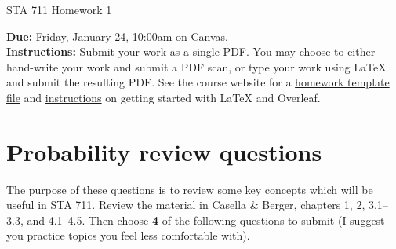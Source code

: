 \documentclass[11pt]{article}
\begin{document}
\begin{center}
\Large
STA 711 Homework 1\\
\normalsize
\vspace{5mm}
\end{center}

\noindent \textbf{Due:} Friday, January 24, 10:00am on Canvas.\\ 

\noindent \textbf{Instructions:} Submit your work as a single PDF. You may choose to either hand-write your work and submit a PDF scan, or type your work using LaTeX and submit the resulting PDF. See the course website for a \href{https://sta711-s25.github.io/homework/hw_template.tex}{homework template file} and \href{https://sta711-s25.github.io/homework/latex_instructions/}{instructions} on getting started with LaTeX and Overleaf.

\section{Probability review questions}

The purpose of these questions is to review some key concepts which will be useful in STA 711. Review the material in Casella \& Berger, chapters 1, 2, 3.1--3.3, and 4.1--4.5. Then choose \textbf{4} of the following questions to submit (I suggest you practice topics you feel less comfortable with).
\end{document}
